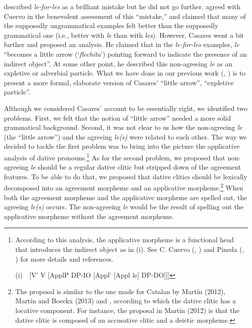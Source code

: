\documentclass[output=paper,colorlinks,citecolor=brown,
]{langscibook}
\begin{document}
\citet{cuervo1955} described \textit{le-for-les} as a brilliant mistake but he did not go further. \citet{casares1918} agreed with Cuervo in the benevolent assessment of this “mistake,” and claimed that many of the supposedly ungrammatical examples felt better than the supposedly grammatical one (i.e., better with \textit{le }than with \textit{les}). However, Casares went a bit further and proposed an analysis. He claimed that in the \textit{le-for-les} examples, \textit{le} “becomes a little arrow (‘\textit{flechita}’) pointing forward to indicate the presence of an indirect object”. At some other point, he described this non-agreeing \textit{le} as an expletive or adverbial particle. What we have done in our previous work (\citeyear{ausin2017}, \citeyear{ausin2021}) is to present a more formal, elaborate version of Casares’ “little arrow”, “expletive particle”.

Although we considered Casares’ account to be essentially right, we identified two problems. First, we felt that the notion of “little arrow” needed a more solid grammatical background. Second, it was not clear to us how the non-agreeing \textit{le} (the “little arrow”) and the agreeing \textit{le(s)} were related to each other\textit{.} The way we decided to tackle the first problem was to bring into the picture the applicative analysis of dative pronouns.\footnote{\textrm{ According to this analysis, the applicative morpheme is a functional head that introduces the indirect object as in (i). See C. Cuervo (\citeyear{cuervo2003datives}, \citeyear{cuervo2010against}) and Pineda (\citeyear{pineda2019}, \citeyear{pineda2020}) for more details and references. }\par \textrm{(i)\ \ [V’ V [ApplP DP-IO [Appl’ [Appl le] DP-DO]]]}} As for the second problem, we proposed that non-agreeing \textit{le }should be a regular dative clitic but stripped down of the agreement features. To be able to do that, we proposed that dative clitics should be lexically decomposed into an agreement morpheme and an applicative morpheme.\footnote{\textrm{ The proposal is similar to the one made for Catalan by Martín (2012), Martín and Boeckx (2013) and \citealt{ordóñez2019}, according to which the dative clitic has a locative component. For instance, the proposal in Martín (2012) is that the dative clitic is composed of an accusative clitic and a deictic morpheme.}} When both the agreement morpheme and the applicative morpheme are spelled out, the agreeing \textit{le(s) }occurs. The non-agreeing \textit{le} would be the result of spelling out the applicative morpheme without the agreement morpheme. 
\end{document}
